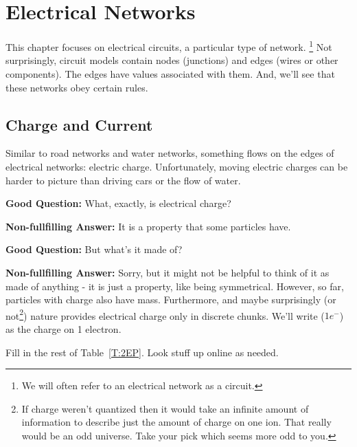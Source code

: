\chapter{Electrical Networks}
This chapter focuses on electrical circuits, a particular type of network. \footnote{We will often refer to an electrical network as a circuit.} Not surprisingly, circuit models contain nodes (junctions) and edges (wires or other components). The edges have values associated with them. And, we'll see that these networks obey certain rules.\par

\section{Charge and Current}
Similar to road networks and water networks, something flows on the edges of electrical networks: electric charge. Unfortunately, moving electric charges can be harder to picture than driving cars or the flow of water.\par

\vspace{6pt}
\setlength{\hangindent}{30pt}\noindent
\textbf{Good Question:} What, exactly, is electrical charge? \par
\vspace{6pt}
\setlength{\hangindent}{30pt}\noindent
\textbf{Non-fullfilling Answer:} It is a property that some particles have. \par
\vspace{6pt}
\setlength{\hangindent}{30pt}\noindent
\textbf{Good Question:} But what's it made of? \par
\vspace{6pt}
\setlength{\hangindent}{30pt}\noindent
\textbf{Non-fullfilling Answer:} Sorry, but it might not be helpful to think of it as made of anything - it is just a property, like being symmetrical. However, so far, particles with charge also have mass. Furthermore, and maybe surprisingly (or not\footnote{If charge weren't quantized then it would take an infinite amount of information to describe just the amount of charge on one ion. That really would be an odd universe. Take your pick which seems more odd to you.}) nature provides electrical charge only in discrete chunks. We'll write ($1 e^-$) as the charge on 1 electron.

\begin{blevel}
Fill in the rest of Table~\ref{T:2EP}. Look stuff up online as needed.
\end{blevel}

